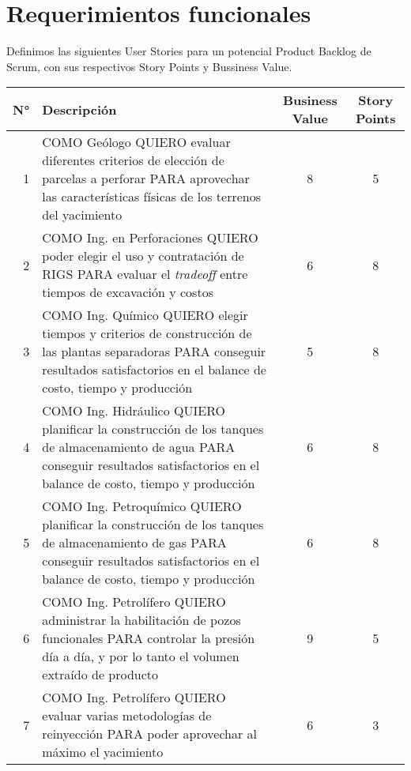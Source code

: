 \section{Requerimientos funcionales}

\newcommand{\BV}[0]{Business Value}
\newcommand{\SP}{Story Points}
\newcommand{\US}[1]{\textbf{US #1}}
\newcommand{\fixme}[1]{\large\textcolor{red}{#1}}

Definimos las siguientes User Stories para un potencial Product Backlog de Scrum, con sus respectivos Story Points y Bussiness Value. 

\begin{center}
  \begin{tabular}{| r | p{10cm} | c | c | }
    \hline
    N° & Descripción & Business Value & Story Points\\  \hline
    
    1  & COMO Geólogo QUIERO evaluar diferentes criterios de elección de parcelas a perforar PARA aprovechar las características físicas de los terrenos del yacimiento & 8 & 5\\  \hline

    2  & COMO Ing. en Perforaciones QUIERO poder elegir el uso y contratación de RIGS PARA evaluar el \textit{tradeoff} entre tiempos de excavación y costos & 6 & 8\\ \hline
    
    3  & COMO Ing. Químico QUIERO elegir tiempos y criterios de construcción de las plantas separadoras PARA conseguir resultados satisfactorios en el balance de costo, tiempo y producción & 5 & 8\\ \hline
    
    4 & COMO Ing. Hidráulico QUIERO planificar la construcción de los tanques de almacenamiento de agua PARA conseguir resultados satisfactorios en el balance de costo, tiempo y producción & 6 & 8\\ \hline
    
    5 & COMO Ing. Petroquímico QUIERO planificar la construcción de los tanques de almacenamiento de gas 
    PARA conseguir resultados satisfactorios en el balance de costo, tiempo y producción & 6 & 8\\ \hline
    
    6 & COMO Ing. Petrolífero QUIERO administrar la habilitación de pozos funcionales PARA controlar 
    la presión día a día, y por lo tanto el volumen extraído de producto & 9 & 5\\ \hline
    
    7 & COMO Ing. Petrolífero QUIERO evaluar varias metodologías de reinyección PARA poder aprovechar 
    al máximo el yacimiento & 6 & 3\\ \hline
    

\end{tabular}
\end{center}
